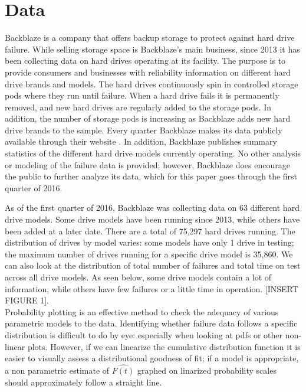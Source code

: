 \documentclass[12pt]{article}
\begin{document}
\section{Data}
Backblaze is a company that offers backup storage to protect against hard drive failure.  While selling storage space is Backblaze's main business, since 2013 it has been collecting data on hard drives operating at its facility.  The purpose is to provide consumers and businesses with reliability information on different hard drive brands and models.  The hard drives continuously spin in controlled storage pods where they run until failure.  When a hard drive fails it is permanently removed, and new hard drives are regularly added to the storage pods.  In addition, the number of storage pods is increasing as Backblaze adds new hard drive brands to the sample.  Every quarter Backblaze makes its data publicly available through their website \cite{backblaze}. In addition, Backblaze publishes summary statistics of the different hard drive models currently operating.  No other analysis or modeling of the failure data is provided; however, Backblaze does encourage the public to further analyze its data, which for this paper goes through the first quarter of 2016.

As of the first quarter of 2016, Backblaze was collecting data on 63 different hard drive models.  Some drive models have been running since 2013, while others have been added at a later date.  There are a total of 75,297 hard drives running.  The distribution of drives by model varies: some models have only 1 drive in testing; the maximum number of drives running for a specific drive model is 35,860.  We can also look at the distribution of total number of failures and total time on test across all drive models.  As seen below, some drive models contain a lot of information, while others have few failures or a little time in operation. [INSERT FIGURE 1]. \\

Probability plotting is an effective method to check the adequacy of various parametric models to the data.  Identifying whether failure data follows a specific distribution is difficult to do by eye: especially when looking at pdfs or other non-linear plots.  However, if we can linearize the cumulative distribution function it is easier to visually assess a distributional goodness of fit; if a model is appropriate, a non parametric estimate of $\hat{F(t)}$ graphed on linarized probability scales should approximately follow a straight line. \\
\end{document}
